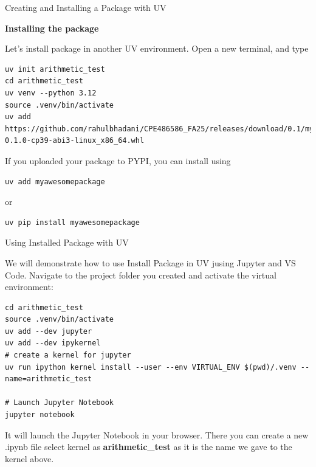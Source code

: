 \documentclass[aspectratio=169,xcolor=dvipsnames,svgnames,x11names,fleqn]{beamer}
\begin{document}
\begin{frame}[containsverbatim]{Creating and Installing a Package with UV}

    \textbf{Installing the package}

    Let's install package in another UV environment. Open a new terminal, and type

\begin{verbatim}
uv init arithmetic_test
cd arithmetic_test
uv venv --python 3.12
source .venv/bin/activate
uv add https://github.com/rahulbhadani/CPE486586_FA25/releases/download/0.1/myawesomepackage-0.1.0-cp39-abi3-linux_x86_64.whl
\end{verbatim}

If you uploaded your package to PYPI, you can install using 

\begin{verbatim}
uv add myawesomepackage 
\end{verbatim}

or 

\begin{verbatim}
uv pip install myawesomepackage 
\end{verbatim}
\end{frame}

\begin{frame}[containsverbatim]{Using Installed Package with UV}
    
    We will demonstrate how to use Install Package in UV jusing Jupyter and VS Code. Navigate to the project folder you created and activate the virtual environment:

    \begin{verbatim}
cd arithmetic_test
source .venv/bin/activate
uv add --dev jupyter
uv add --dev ipykernel
# create a kernel for jupyter
uv run ipython kernel install --user --env VIRTUAL_ENV $(pwd)/.venv --name=arithmetic_test

# Launch Jupyter Notebook
jupyter notebook

\end{verbatim}

It will launch the Jupyter Notebook in your browser. There you can create a new .ipynb file select kernel as \textbf{arithmetic\_test} as it is the name we gave to the kernel above.


    
\end{frame}
\end{document}
